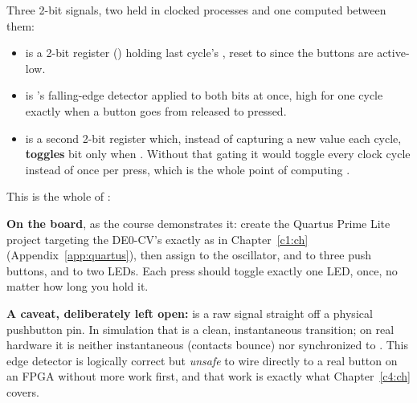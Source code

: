 \noindent Three 2-bit signals, two held in clocked processes and one computed between them:
\begin{itemize}
  \item {} is a 2-bit register () holding last cycle's
    , reset to  since the buttons are active-low.
  \item {} is 's falling-edge
    detector applied to both bits at once, high for one cycle exactly when a button goes from
    released to pressed.
  \item {} is a second 2-bit register which, instead of capturing a new value each cycle,
    \textbf{toggles} bit  only when . Without that gating it would
    toggle every clock cycle instead of once per press, which is the whole point of computing
    .
\end{itemize}
This is the whole of :


\textbf{On the board}, as the course demonstrates it: create the Quartus Prime Lite project targeting
the DE0-CV's  exactly as in Chapter~\ref{c1:ch} (Appendix~\ref{app:quartus}),
then assign  to the  oscillator,  and
 to three push buttons, and  to two LEDs. Each
press should toggle exactly one LED, once, no matter how long you hold it.

\textbf{A caveat, deliberately left open:}  is a raw signal straight off a physical
pushbutton pin. In simulation that is a clean, instantaneous transition; on real hardware it is
neither instantaneous (contacts bounce) nor synchronized to . This edge detector is
logically correct but \emph{unsafe} to wire directly to a real button on an FPGA without more work
first, and that work is exactly what Chapter~\ref{c4:ch} covers.
